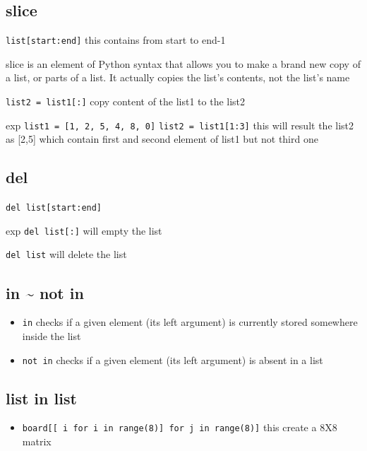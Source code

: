 \documentclass[11pt]{article}
\begin{document}
\subsection{slice}
\label{sec:org19516a1}
\begin{description}
\item[{syntax}] \texttt{list[start:end]}
this contains from start to end-1
\item slice is an element of Python syntax that allows you to make a brand
new copy of a list, or parts of a list. It actually copies the list’s
contents, not the list’s name
\item \texttt{list2 = list1[:]} 
copy content of the list1 to the list2
\item exp
\texttt{list1 = [1, 2, 5, 4, 8, 0]} 
\texttt{list2 = list1[1:3]} 
this will result the list2 as [2,5] which contain
first and second element of list1 but not third one
\end{description}

\subsection{del}
\label{sec:org52a6f39}
\begin{description}
\item[{syntax}] \texttt{del list[start:end]}
\item exp \texttt{del list[:]} will empty the list
\item[{syntax}] \texttt{del list} will delete the list
\end{description}
\subsection{in \textasciitilde{} not in}
\label{sec:org327a5f2}
\begin{itemize}
\item \texttt{in} checks if a given element (its left argument) is currently
stored somewhere inside the list
\item \texttt{not in} checks if a given element (its left argument) is absent in
a list
\end{itemize}
\subsection{list in list}
\label{sec:orgb854a45}
\begin{itemize}
\item \texttt{board[[ i for i in range(8)] for j in range(8)]}
this create a 8X8 matrix
\end{itemize}
\end{document}
